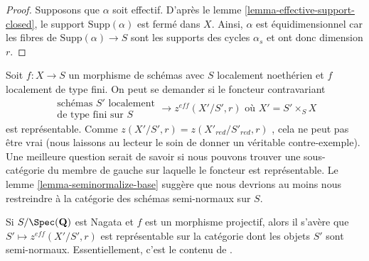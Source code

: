 \begin{proof} 
Supposons que  $\alpha$  soit effectif. D'après le lemme \ref{lemma-effective-support-closed},
 le support $\text{Supp}(\alpha)$  est fermé dans  $X$. Ainsi,  
$\alpha$  est équidimensionnel car les fibres de  $\text{Supp}(\alpha) \to S$
  sont les supports des cycles  $\alpha_s$  et ont donc dimension  $r$. 
\end{proof} 

\begin{remark} 
\label{remark-representable} 
Soit  $f : X \to S$  un morphisme de schémas avec  $S$  localement noethérien
 et  $f$  localement de type fini. On peut se demander si le foncteur contravariant 
$$
\begin{matrix}
\text{schémas }S'\text{ localement} \\
\text{de type fini sur }S
\end{matrix}
\longrightarrow
z^{eff}(X'/S', r)\text{ où }X' = S' \times_S X
$$
 est représentable. Comme  $z(X'/S', r) = z(X'_{red}/S'_{red}, r)$
 , cela ne peut pas être vrai (nous laissons au lecteur le soin de donner un véritable
 contre-exemple). Une meilleure question serait de savoir si nous pouvons 
trouver une sous-catégorie du membre de gauche sur laquelle le foncteur est
 représentable. Le lemme  \ref{lemma-seminormalize-base}  suggère que 
nous devrions au moins nous restreindre à la catégorie des schémas semi-normaux sur $S$. 

\medskip\noindent
 Si  $S/\Spec(\mathbf{Q})$  est Nagata et  $f$  est un morphisme projectif, alors
 il s'avère que  $S' \mapsto z^{eff}(X'/S', r)$  est représentable sur la 
catégorie dont les objets $S'$  sont semi-normaux. Essentiellement, c'est le contenu de 
\cite[Theorem 3.21]{KRC}. 


\end{remark}
